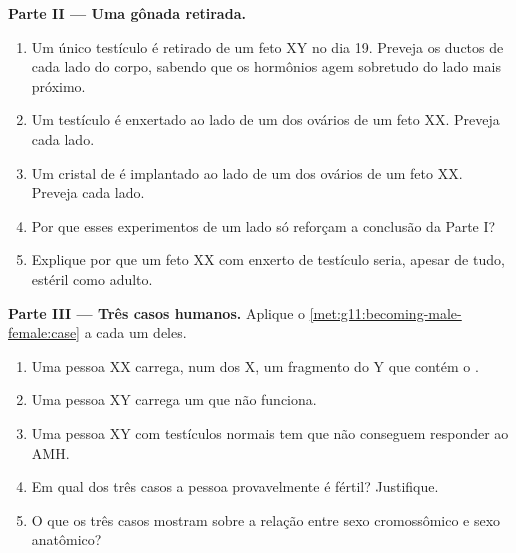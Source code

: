 \begin{problem}
\medskip
\noindent\textbf{Parte II --- Uma gônada retirada.}
\begin{enumerate}[resume]
  \item Um único testículo é retirado de um feto XY no dia 19. Preveja
        os ductos de cada lado do corpo, sabendo que os hormônios agem
        sobretudo do lado mais próximo.
  \item Um testículo é enxertado ao lado de um dos ovários de um feto
        XX. Preveja cada lado.
  \item Um cristal de  é implantado ao lado de um dos
        ovários de um feto XX. Preveja cada lado.
  \item Por que esses experimentos de um lado só reforçam a conclusão
        da Parte I?
  \item Explique por que um feto XX com enxerto de testículo seria,
        apesar de tudo, estéril como adulto.
\end{enumerate}

\medskip
\noindent\textbf{Parte III --- Três casos humanos.}
Aplique o \cref{met:g11:becoming-male-female:case} a cada um deles.
\begin{enumerate}[resume]
  \item Uma pessoa XX carrega, num dos  X, um fragmento do Y
        que contém o .
  \item Uma pessoa XY carrega um  que não funciona.
  \item Uma pessoa XY com testículos normais tem  que não
        conseguem responder ao AMH.
  \item Em qual dos três casos a pessoa provavelmente é fértil?
        Justifique.
  \item O que os três casos mostram sobre a relação entre sexo
        cromossômico e sexo anatômico?
\end{enumerate}


\end{problem}
